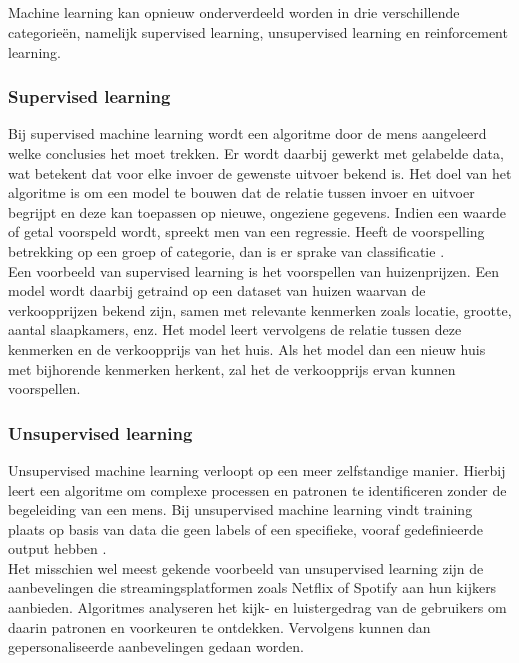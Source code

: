\subsection{}%
\label{sec:machine learning}

Machine learning kan opnieuw onderverdeeld worden in drie verschillende categorieën, namelijk supervised learning, unsupervised learning en reinforcement learning. 

\subsubsection{Supervised learning}

Bij supervised machine learning wordt een algoritme door de mens aangeleerd welke conclusies het moet trekken. Er wordt daarbij gewerkt met gelabelde data, wat betekent dat voor elke invoer de gewenste uitvoer bekend is. Het doel van het algoritme is om een model te bouwen dat de relatie tussen invoer en uitvoer begrijpt en deze kan toepassen op nieuwe, ongeziene gegevens. Indien een waarde of getal voorspeld wordt, spreekt men van een regressie. Heeft de voorspelling betrekking op een groep of categorie, dan is er sprake van classificatie \autocite{Brownlee2023}. \\

Een voorbeeld van supervised learning is het voorspellen van huizenprijzen. Een model wordt daarbij getraind op een dataset van huizen waarvan de verkoopprijzen bekend zijn, samen met relevante kenmerken zoals locatie, grootte, aantal slaapkamers, enz. Het model leert vervolgens de relatie tussen deze kenmerken en de verkoopprijs van het huis. Als het model dan een nieuw huis met bijhorende kenmerken herkent, zal het de verkoopprijs ervan kunnen voorspellen.

\subsubsection{Unsupervised learning}

Unsupervised machine learning verloopt op een meer zelfstandige manier. Hierbij leert een algoritme om complexe processen en patronen te identificeren zonder de begeleiding van een mens. Bij unsupervised machine learning vindt training plaats op basis van data die geen labels of een specifieke, vooraf gedefinieerde output hebben  \autocite{Brownlee2023}. \\

Het misschien wel meest gekende voorbeeld van unsupervised learning zijn de aanbevelingen die streamingsplatformen zoals Netflix of Spotify aan hun kijkers aanbieden. Algoritmes analyseren het kijk- en luistergedrag van de gebruikers om daarin patronen en voorkeuren te ontdekken. Vervolgens kunnen dan gepersonaliseerde aanbevelingen gedaan worden.


